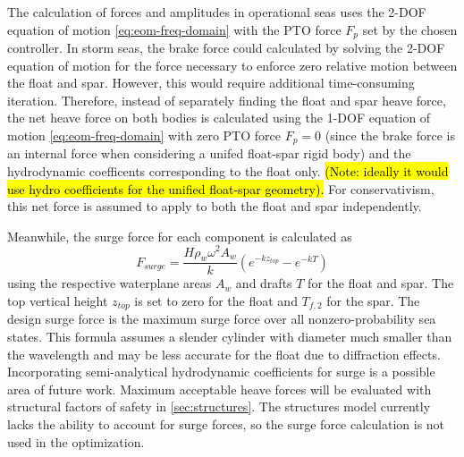 The calculation of forces and amplitudes in operational seas uses the 2-DOF equation of motion \eqref{eq:eom-freq-domain} with the PTO force $F_p$ set by the chosen controller.
In storm seas, the brake force could calculated by solving the 2-DOF equation of motion for the force necessary to enforce zero relative motion between the float and spar.
However, this would require additional time-consuming iteration. Therefore, instead of separately finding the float and spar heave force, the net heave force on both bodies is calculated using the 1-DOF equation of motion \eqref{eq:eom-freq-domain} with zero PTO force $F_p=0$ (since the brake force is an internal force when considering a unifed float-spar rigid body) and the hydrodynamic coefficents corresponding to the float only. \hl{(Note: ideally it would use hydro coefficients for the unified float-spar geometry).}
For conservativism, this net force is assumed to apply to both the float and spar independently. %

Meanwhile, the surge force for each component is calculated as \cite{newman_motions_1963}
\begin{equation}\label{eq:surge-force}
   F_{surge} = \frac{H\rho_w \omega^2 A_w}{k} (e^{-kz_{top}}-e^{-kT})
\end{equation}
using the respective waterplane areas $A_w$  and drafts $T$ for the float and spar.
The top vertical height $z_{top}$ is set to zero for the float and $T_{f,2}$ for the spar.
The design surge force is the maximum surge force over all nonzero-probability sea states.
This formula assumes a slender cylinder with diameter much smaller than the wavelength and may be less accurate for the float due to diffraction effects.
Incorporating semi-analytical hydrodynamic coefficients for surge is a possible area of future work. 
Maximum acceptable heave %
forces will be evaluated with structural factors of safety in \ref{sec:structures}.
The structures model currently lacks the ability to account for surge forces, so the surge force calculation is not used in the optimization.


